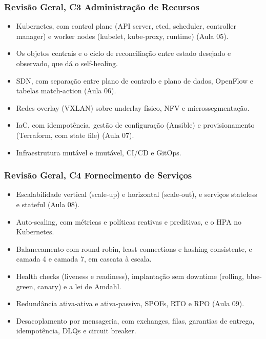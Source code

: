 \documentclass[aspectratio=169]{beamer}
\begin{document}
\begin{frame}
\frametitle{Revisão Geral, C3 Administração de Recursos}
\begin{itemize}
    \setlength\itemsep{0.12cm}
    \small
    \item Kubernetes, com control plane (API server, etcd, scheduler, controller manager) e worker nodes (kubelet, kube-proxy, runtime) (Aula 05).
    \item Os objetos centrais e o ciclo de reconciliação entre estado desejado e observado, que dá o self-healing.
    \item SDN, com separação entre plano de controlo e plano de dados, OpenFlow e tabelas match-action (Aula 06).
    \item Redes overlay (VXLAN) sobre underlay físico, NFV e microssegmentação.
    \item IaC, com idempotência, gestão de configuração (Ansible) e provisionamento (Terraform, com state file) (Aula 07).
    \item Infraestrutura mutável e imutável, CI/CD e GitOps.
\end{itemize}
\end{frame}

\begin{frame}
\frametitle{Revisão Geral, C4 Fornecimento de Serviços}
\begin{itemize}
    \setlength\itemsep{0.12cm}
    \small
    \item Escalabilidade vertical (scale-up) e horizontal (scale-out), e serviços stateless e stateful (Aula 08).
    \item Auto-scaling, com métricas e políticas reativas e preditivas, e o HPA no Kubernetes.
    \item Balanceamento com round-robin, least connections e hashing consistente, e camada 4 e camada 7, em cascata à escala.
    \item Health checks (liveness e readiness), implantação sem downtime (rolling, blue-green, canary) e a lei de Amdahl.
    \item Redundância ativa-ativa e ativa-passiva, SPOFs, RTO e RPO (Aula 09).
    \item Desacoplamento por mensageria, com exchanges, filas, garantias de entrega, idempotência, DLQs e circuit breaker.
\end{itemize}
\end{frame}
\end{document}
